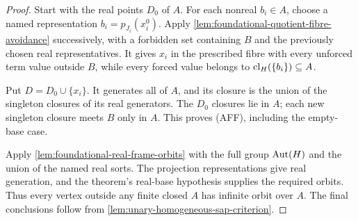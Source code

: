 \begin{proof}
Start with the real points $D_0$ of $A$. For each nonreal $b_i\in A$,
choose a named representation $b_i=p_{J_i}(x_i^0)$. Apply
\cref{lem:foundational-quotient-fibre-avoidance} successively, with a
forbidden set containing $B$ and the previously chosen real
representatives. It gives $x_i$ in the prescribed fibre with every
unforced term value outside $B$, while every forced value belongs to
$\operatorname{cl}_H(\{b_i\})\subseteq A$.

Put $D=D_0\cup\{x_i\}$. It generates all of $A$, and its closure is
the union of the singleton closures of its real generators. The
$D_0$ closures lie in $A$; each new singleton closure meets $B$ only
in $A$. This proves (AFF), including the empty-base case.

Apply \cref{lem:foundational-real-frame-orbits} with the full group
$\operatorname{Aut}(H)$ and the union of the named real sorts. The projection
representations give real generation, and the theorem's real-base
hypothesis supplies the required orbits. Thus every vertex outside
any finite closed $A$ has infinite orbit over $A$. The final conclusions
follow from \cref{lem:unary-homogeneous-sap-criterion}.
\end{proof}

